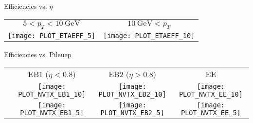 \begin{frame}{Efficiencies vs. $\eta$}
    \begin{table}[]
\begin{tabular}{cc}
    $5 < p_{T} < 10~\mathrm{GeV}$ & $10~\mathrm{GeV}< p_{T}$ \\
    \texttt{[image: PLOT\_ETAEFF\_5]} &
    \texttt{[image: PLOT\_ETAEFF\_10]} \\
\end{tabular}
    \end{table}
\end{frame}

\begin{frame}{Efficiencies vs. Pileuep}
    \begin{table}[]
\begin{tabular}{cccc}
    {} & EB1 ($\eta < 0.8$) & EB2 ($\eta > 0.8$) & EE \\
    \raisebox{0.7\totalheight}{\rotatebox[origin=c]{90}{$10~\mathrm{GeV}< p_{T}$}} &
    \texttt{[image: PLOT\_NVTX\_EB1\_10]} &
    \texttt{[image: PLOT\_NVTX\_EB2\_10]} &
    \texttt{[image: PLOT\_NVTX\_EE\_10]} \\
    \raisebox{0.55\totalheight}{\rotatebox[origin=c]{90}{$5 < p_{T} < 10~\mathrm{GeV}$}} &
    \texttt{[image: PLOT\_NVTX\_EB1\_5]} &
    \texttt{[image: PLOT\_NVTX\_EB2\_5]} &
    \texttt{[image: PLOT\_NVTX\_EE\_5]} \\
\end{tabular}
    \end{table}
\end{frame}


